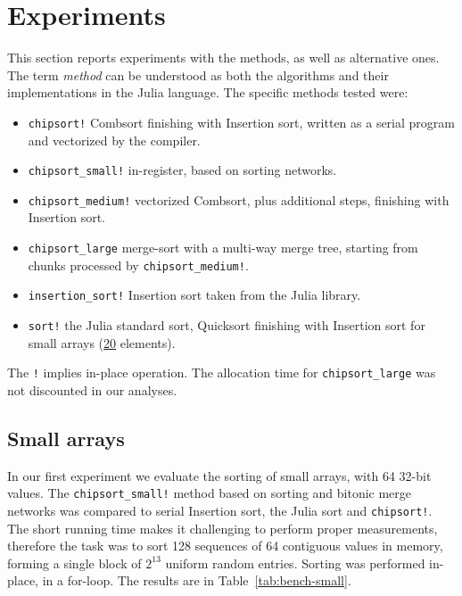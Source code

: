 \documentclass{juliacon}
\begin{document}
\section{Experiments}
\label{sec:experiments}
%
This section reports experiments with the \chipsort methods, as well as alternative ones. The term {\it method} can be understood as both the algorithms and their implementations in the Julia language. The specific methods tested were:
\begin{itemize}
\item {\tt chipsort!} Combsort finishing with Insertion sort, written as a serial program and vectorized by the compiler.
\item {\tt chipsort\_small!} in-register, based on sorting networks.
\item {\tt chipsort\_medium!} vectorized Combsort, plus additional steps, finishing with Insertion sort.
\item {\tt chipsort\_large} merge-sort with a multi-way merge tree, starting from chunks processed by {\tt chipsort\_medium!}.
\item {\tt insertion\_sort!} Insertion sort taken from the Julia library.
\item {\tt sort!} the Julia standard sort, Quicksort finishing with Insertion sort for small arrays (\href{https://github.com/JuliaLang/julia/blob/de3401908a506727ed70b3e953bd721ab4d66109/base/sort.jl#L461}{20} elements).
\end{itemize}

The {\tt !} implies in-place operation. The allocation time for {\tt chipsort\_large} was not discounted in our analyses.

\subsection{Small arrays}
In our first experiment we evaluate the sorting of small arrays, with 64 32-bit values. The {\tt chipsort\_small!} method based on sorting and bitonic merge networks was compared to serial Insertion sort, the Julia sort and {\tt chipsort!}. The short running time makes it challenging to perform proper measurements, therefore the task was to sort 128 sequences of 64 contiguous values in memory, forming a single block of $2^{13}$ uniform random entries. Sorting was performed in-place, in a for-loop. The results are in Table~\ref{tab:bench-small}.

\begin{table}[h]
\label{tab:bench-small}
\end{table}
\end{document}
